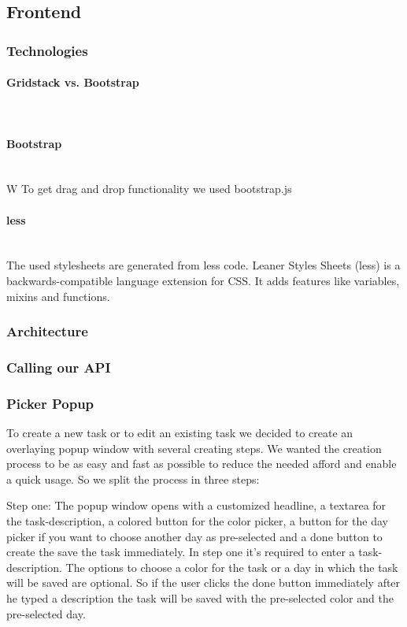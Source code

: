 \subsection{Frontend}
\subsubsection{Technologies}
\paragraph{Gridstack vs. Bootstrap}\mbox{}\\
\paragraph{Bootstrap}\mbox{}\\
W
To get drag and drop functionality we used bootstrap.js 
\paragraph{less}\mbox{}\\
The used stylesheets are generated from less code. 
Leaner Styles Sheets (less) is a backwards-compatible language extension for CSS. It adds features like variables, mixins and functions.


\subsubsection{Architecture}
\subsubsection{Calling our API}

\subsubsection{Picker Popup}


To create a new task or to edit an existing task we decided to create an overlaying popup window with several creating steps.
We wanted the creation process to be as easy and fast as possible to reduce the needed afford and enable a quick usage.
So we split the process in three steps:

Step one:
The popup window opens with a customized headline, a textarea for the task-description, a colored button for the color picker, a button for the day picker if you want to choose another day as pre-selected and a done button to create the save the task immediately.
In step one it’s required to enter a task-description. The options to choose a color for the task or a day in which the task will be saved are optional. So if the user clicks the done button immediately after he typed a description the task will be saved with the pre-selected color and the pre-selected day. 

